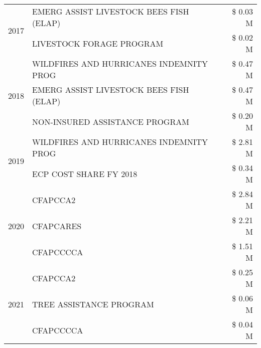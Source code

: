\begin{tabular}{llr}
\cline{1-3}
\multirow[t]{2}{*}{2017} & EMERG ASSIST LIVESTOCK BEES FISH (ELAP) & \$ 0.03 M \\
 & LIVESTOCK FORAGE PROGRAM & \$ 0.02 M \\
\cline{1-3}
\multirow[t]{3}{*}{2018} & WILDFIRES AND HURRICANES INDEMNITY PROG & \$ 0.47 M \\
 & EMERG ASSIST LIVESTOCK BEES FISH (ELAP) & \$ 0.47 M \\
 & NON-INSURED ASSISTANCE PROGRAM & \$ 0.20 M \\
\cline{1-3}
\multirow[t]{2}{*}{2019} & WILDFIRES AND HURRICANES INDEMNITY PROG & \$ 2.81 M \\
 & ECP COST SHARE FY 2018 & \$ 0.34 M \\
\cline{1-3}
\multirow[t]{3}{*}{2020} & CFAPCCA2 & \$ 2.84 M \\
 & CFAPCARES & \$ 2.21 M \\
 & CFAPCCCCA & \$ 1.51 M \\
\cline{1-3}
\multirow[t]{3}{*}{2021} & CFAPCCA2 & \$ 0.25 M \\
 & TREE ASSISTANCE PROGRAM & \$ 0.06 M \\
 & CFAPCCCCA & \$ 0.04 M \\
\cline{1-3}
\bottomrule
\end{tabular}
